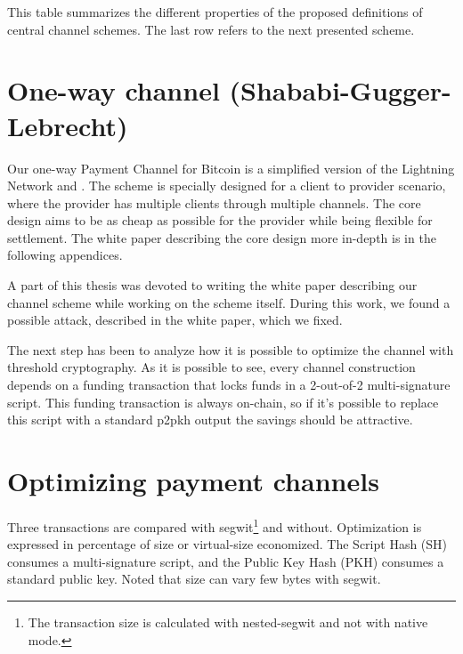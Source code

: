 This table summarizes the different properties of the proposed definitions of
central channel schemes. The last row refers to the next presented scheme.

\section{One-way channel (Shababi-Gugger-Lebrecht)}

Our one-way Payment Channel for Bitcoin is a simplified version of the Lightning
Network and  \cite{poon2016bitcoin,
YoursLightningProtocol}. The scheme is specially designed for a client
to provider scenario, where the provider has multiple clients through multiple
channels. The core design aims to be as cheap as possible for the provider while
being flexible for settlement. The white paper describing the core design more
in-depth is in the following appendices.

A part of this thesis was devoted to writing the white paper describing our
channel scheme while working on the scheme itself. During this work, we found a
possible attack, described in the white paper, which we fixed.

The next step has been to analyze how it is possible to optimize the channel
with threshold cryptography. As it is possible to see, every channel
construction depends on a funding transaction that locks funds in a 2-out-of-2
multi-signature script. This funding transaction is always on-chain, so if it's
possible to replace this script with a standard \gls{p2pkh} output the savings
should be attractive.

\section{Optimizing payment channels}


Three transactions are compared with \gls{segwit}\footnote{ The transaction size is calculated with nested-\gls{segwit} and not with native mode.} and without. Optimization is expressed in percentage of size or virtual-size economized. The Script Hash (SH) consumes a multi-signature script, and the Public Key Hash (PKH) consumes a standard public key. Noted that size can vary few bytes with \gls{segwit}.

